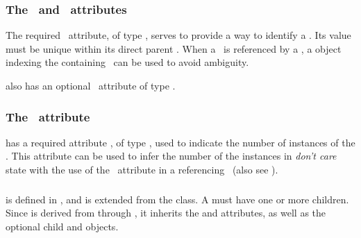 \subsubsection{The \idAtt\ and \nameAtt\ attributes}
\label{def:SpeciesFeatureType:idAndName}

The required \idAtt\ attribute, of type \SIdPT, serves to provide a way to identify a \speciesFeatureType. Its value must be unique within its direct parent \speciesType. When a \speciesFeatureType\ is referenced by a \speciesFeature, a \SpeciesTypeComponentIndex object indexing the containing \component\ can be used to avoid ambiguity. 

 also has an optional \nameAtt\ attribute of type \stringPT. 

\subsubsection{The \occurAtt\ attribute}
\label{def:SpeciesFeatureType:occur}

 has a required attribute \occurAtt, of type \positiveIntegerPT, used to indicate the number of instances of the \speciesFeatureType. This attribute can be used to infer the number of the instances in \emph{don't care} state with the use of the \occurAtt\ attribute in a referencing \speciesFeature\ (also see ). 


\subsubsection{}
\label{def:ListOfPossibleSpeciesFeatureValues}

 is defined in , and is extended from the  class. A 
 must have one or more \PossibleSpeciesFeatureValue children. Since  is derived from  through , it inherits the  and  attributes, as well as the optional \mBlockChangedBegin{\revTwentyTwentyMarch}child\mBlockChangedEnd{\revTwentyTwentyMarch}  and  objects. 


